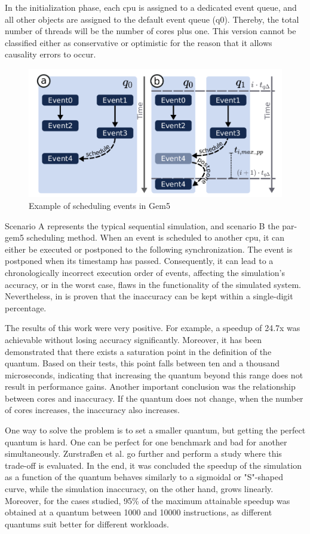 In the initialization phase, each \gls{cpu} is assigned to a dedicated event queue, and all other objects are assigned to the default event 
queue (q0). Thereby, the total number of threads will be the number of cores plus one. This version cannot be classified either as conservative 
or optimistic for the reason that it allows causality errors to occur.

\begin{figure}[H]
	\centering
 	\includegraphics[width=0.7\linewidth]{Images/SchedulingEventGem5.png}
 	\caption{Example of scheduling events in Gem5 \cite{pargem5}}
	 \label{fig_SchedulingEventGem5}
\end{figure}

Scenario A represents the typical sequential simulation, and scenario B the par-gem5 scheduling method. When an event is scheduled to another 
\gls{cpu}, it can either be executed or postponed to the following synchronization. The event is postponed when its timestamp has passed. 
Consequently, it can lead to a chronologically incorrect execution order of events, affecting the simulation's accuracy, or in the worst case, 
flaws in the functionality of the simulated system. Nevertheless, in \cite{pargem5} is proven that the inaccuracy can be kept within a single-digit 
percentage.

The results of this work were very positive. For example, a speedup of 24.7x was achievable without losing accuracy significantly. Moreover, 
it has been demonstrated that there exists a saturation point in the definition of the quantum. Based on their tests, this point falls between 
ten and a thousand microseconds, indicating that increasing the quantum beyond this range does not result in performance gains. Another 
important conclusion was the relationship between cores and inaccuracy. If the quantum does not change, when the number of cores increases, the 
inaccuracy also increases. 

One way to solve the problem is to set a smaller quantum, but getting the perfect quantum is hard. One can be perfect for one benchmark and 
bad for another simultaneously. Zurstraßen et al. \cite{BeyondQuantumTDSim} go further and perform a study where this trade-off is evaluated. 
In the end, it was concluded the speedup of the simulation as a function of the quantum behaves similarly to a sigmoidal or "S"-shaped curve, while 
the simulation inaccuracy, on the other hand, grows linearly. Moreover, for the cases studied, 95\% of the maximum attainable speedup was 
obtained at a quantum between 1000 and 10000 instructions, as different quantums suit better for different workloads.

